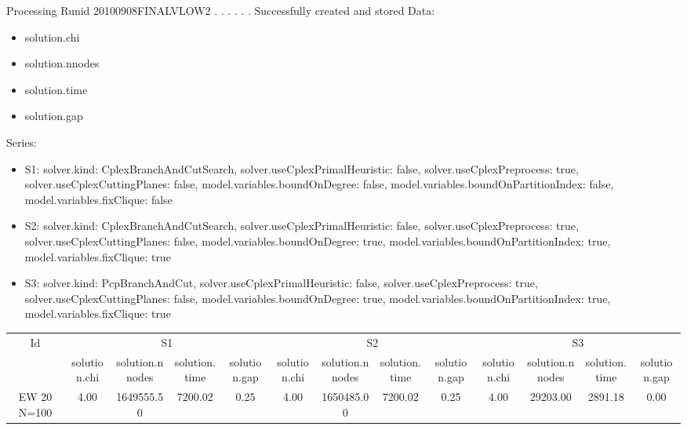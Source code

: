 \documentclass[landscape, 12pt]{report}
\begin{document}
	Processing Runid 20100908FINALVLOW2
. . . . . .  Successfully created and stored
Data:
\begin{itemize}
\item solution.chi
\item solution.nnodes
\item solution.time
\item solution.gap
\end{itemize}
Series:
\begin{itemize}
\item S1: solver.kind: CplexBranchAndCutSearch, solver.useCplexPrimalHeuristic: false, solver.useCplexPreprocess: true, solver.useCplexCuttingPlanes: false, model.variables.boundOnDegree: false, model.variables.boundOnPartitionIndex: false, model.variables.fixClique: false
\item S2: solver.kind: CplexBranchAndCutSearch, solver.useCplexPrimalHeuristic: false, solver.useCplexPreprocess: true, solver.useCplexCuttingPlanes: false, model.variables.boundOnDegree: true, model.variables.boundOnPartitionIndex: true, model.variables.fixClique: true
\item S3: solver.kind: PcpBranchAndCut, solver.useCplexPrimalHeuristic: false, solver.useCplexPreprocess: true, solver.useCplexCuttingPlanes: false, model.variables.boundOnDegree: true, model.variables.boundOnPartitionIndex: true, model.variables.fixClique: true
\end{itemize}
\begin{tabular}{|c|cccc|cccc|cccc|}
\hline
\multicolumn{1}{|c|}{Id} & \multicolumn{4}{|c|}{S1} & \multicolumn{4}{|c|}{S2} & \multicolumn{4}{|c|}{S3}
\\
 & solution.chi & solution.nnodes & solution.time & solution.gap & solution.chi & solution.nnodes & solution.time & solution.gap & solution.chi & solution.nnodes & solution.time & solution.gap
\\
\hline
EW 20 N=100 & 4.00 & 1649555.50 & 7200.02 & 0.25 & 4.00 & 1650485.00 & 7200.02 & 0.25 & 4.00 & 29203.00 & 2891.18 & 0.00
\\
\hline 
 \end{tabular}
 
\end{document}
